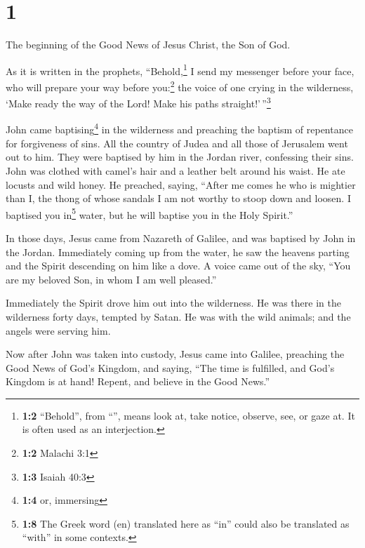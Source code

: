 \hypertarget{section}{%
\section{1}\label{section}}

 The beginning of the Good News of Jesus Christ, the Son
of God.

 As it is written in the prophets, ``Behold,\footnote{\textbf{1:2}
  ``Behold'', from ``'', means look at, take notice,
  observe, see, or gaze at. It is often used as an interjection.} I send
my messenger before your face, who will prepare your way before
you:\footnote{\textbf{1:2} Malachi 3:1}  the voice of one
crying in the wilderness, `Make ready the way of the Lord! Make his
paths straight!'\,''\footnote{\textbf{1:3} Isaiah 40:3}

 John came baptising\footnote{\textbf{1:4} or, immersing}
in the wilderness and preaching the baptism of repentance for
forgiveness of sins.  All the country of Judea and all
those of Jerusalem went out to him. They were baptised by him in the
Jordan river, confessing their sins.  John was clothed
with camel's hair and a leather belt around his waist. He ate locusts
and wild honey.  He preached, saying, ``After me comes he
who is mightier than I, the thong of whose sandals I am not worthy to
stoop down and loosen.  I baptised you in\footnote{\textbf{1:8}
  The Greek word (en) translated here as ``in'' could also be translated
  as ``with'' in some contexts.} water, but he will baptise you in the
Holy Spirit.''

 In those days, Jesus came from Nazareth of Galilee, and
was baptised by John in the Jordan.  Immediately coming
up from the water, he saw the heavens parting and the Spirit descending
on him like a dove.  A voice came out of the sky, ``You
are my beloved Son, in whom I am well pleased.''

 Immediately the Spirit drove him out into the
wilderness.  He was there in the wilderness forty days,
tempted by Satan. He was with the wild animals; and the angels were
serving him.

 Now after John was taken into custody, Jesus came into
Galilee, preaching the Good News of God's Kingdom,  and
saying, ``The time is fulfilled, and God's Kingdom is at hand! Repent,
and believe in the Good News.''

